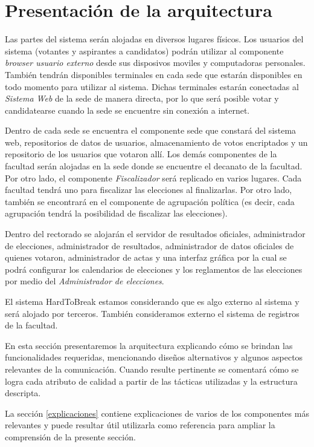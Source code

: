 \section{Presentación de la arquitectura}
Las partes del sistema ser\'an alojadas en diversos lugares f\'isicos. Los usuarios del sistema (votantes y aspirantes a candidatos) podr\'an utilizar al componente \emph{browser usuario externo} desde sus disposivos moviles y computadoras personales. Tambi\'en tendr\'an disponibles terminales en cada sede que estar\'an disponibles en todo momento para utilizar al sistema. Dichas terminales estar\'an conectadas al \emph{Sistema Web} de la sede de manera directa, por lo que ser\'a posible votar y candidatearse cuando la sede se encuentre sin conexi\'on a internet.

Dentro de cada sede se encuentra el componente sede que constar\'a del sistema web, repositorios de datos de usuarios, almacenamiento de votos encriptados y un repositorio de los usuarios que votaron all\'i. 
Los dem\'as componentes de la facultad ser\'an alojadas en la sede donde se encuentre el decanato de la facultad. Por otro lado, el componente \emph{Fiscalizador} ser\'a replicado en varios lugares. Cada facultad tendr\'a uno para fiscalizar las elecciones al finalizarlas. Por otro lado, tambi\'en se encontrar\'a en el componente de agrupaci\'on pol\'itica (es decir, cada agrupaci\'on tendr\'a la posibilidad de fiscalizar las elecciones).

Dentro del rectorado se alojar\'an el servidor de resultados oficiales, administrador de elecciones, administrador de resultados, administrador de datos oficiales de quienes votaron, administrador de actas y una interfaz gr\'afica por la cual se podr\'a configurar los calendarios de elecciones y los reglamentos de las elecciones por medio del \emph{Administrador de elecciones}.

El sistema HardToBreak estamos considerando que es algo externo al sistema y ser\'a alojado por terceros. Tambi\'en consideramos externo el sistema de registros de la facultad.

En esta sección presentaremos la arquitectura explicando cómo se brindan las funcionalidades requeridas, mencionando diseños alternativos y algunos aspectos relevantes de la comunicación. Cuando resulte pertinente se comentará cómo se logra cada atributo de calidad a partir de las tácticas utilizadas y la estructura descripta. 


La sección \ref{explicaciones} contiene explicaciones de varios de los componentes más relevantes y puede resultar útil utilizarla como referencia para ampliar la comprensión de la presente sección.



